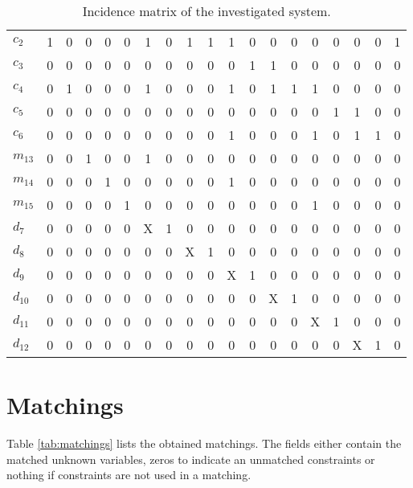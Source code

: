 \documentclass[a4,11pt]{article}
\begin{document}
\begin{table}[!htb]
\begin{tabular}{|l|ccccc|ccccccccccccc|}
$c_2$  & 1 & 0 & 0 & 0 & 0 & 1 & 0 & 1 & 1 & 1 & 0 & 0 & 0 & 0 & 0 & 0 & 0 & 1 \\ 
$c_3$  & 0 & 0 & 0 & 0 & 0 & 0 & 0 & 0 & 0 & 0 & 1 & 1 & 0 & 0 & 0 & 0 & 0 & 0 \\ 
$c_4$  & 0 & 1 & 0 & 0 & 0 & 1 & 0 & 0 & 0 & 1 & 0 & 1 & 1 & 1 & 0 & 0 & 0 & 0 \\ 
$c_5$  & 0 & 0 & 0 & 0 & 0 & 0 & 0 & 0 & 0 & 0 & 0 & 0 & 0 & 0 & 1 & 1 & 0 & 0 \\ 
$c_6$  & 0 & 0 & 0 & 0 & 0 & 0 & 0 & 0 & 0 & 1 & 0 & 0 & 0 & 1 & 0 & 1 & 1 & 0 \\ 
$m_{13}$  & 0 & 0 & 1 & 0 & 0 & 1 & 0 & 0 & 0 & 0 & 0 & 0 & 0 & 0 & 0 & 0 & 0 & 0 \\ 
$m_{14}$  & 0 & 0 & 0 & 1 & 0 & 0 & 0 & 0 & 0 & 1 & 0 & 0 & 0 & 0 & 0 & 0 & 0 & 0 \\ 
$m_{15}$  & 0 & 0 & 0 & 0 & 1 & 0 & 0 & 0 & 0 & 0 & 0 & 0 & 0 & 1 & 0 & 0 & 0 & 0 \\ 
\hline
$d_7$  & 0 & 0 & 0 & 0 & 0 & X & 1 & 0 & 0 & 0 & 0 & 0 & 0 & 0 & 0 & 0 & 0 & 0 \\ 
$d_8$  & 0 & 0 & 0 & 0 & 0 & 0 & 0 & X & 1 & 0 & 0 & 0 & 0 & 0 & 0 & 0 & 0 & 0 \\ 
$d_9$  & 0 & 0 & 0 & 0 & 0 & 0 & 0 & 0 & 0 & X & 1 & 0 & 0 & 0 & 0 & 0 & 0 & 0 \\ 
$d_{10}$  & 0 & 0 & 0 & 0 & 0 & 0 & 0 & 0 & 0 & 0 & 0 & X & 1 & 0 & 0 & 0 & 0 & 0 \\ 
$d_{11}$  & 0 & 0 & 0 & 0 & 0 & 0 & 0 & 0 & 0 & 0 & 0 & 0 & 0 & X & 1 & 0 & 0 & 0 \\ 
$d_{12}$  & 0 & 0 & 0 & 0 & 0 & 0 & 0 & 0 & 0 & 0 & 0 & 0 & 0 & 0 & 0 & X & 1 & 0 \\ \hline
\end{tabular}
\caption{Incidence matrix of the investigated system.}
\label{tab:matrix}
\end{table}
\newpage
\section{Matchings}
Table \ref{tab:matchings} lists the obtained matchings. The fields either contain the matched unknown variables, zeros to indicate an unmatched constraints or nothing if constraints are not used in a matching.\setlength\tabcolsep{2mm}
\end{document}
